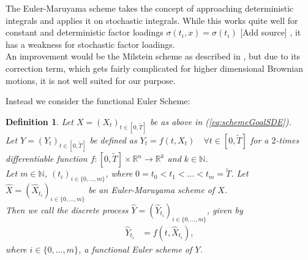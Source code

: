 \documentclass[12pt]{article}
\newtheorem{definition}[theorem]{Definition}
\begin{document}
	The Euler-Maruyama scheme takes the concept of approaching deterministic integrals and applies it on stochastic integrals. While this works quite well for constant and deterministic factor loadings $\sigma(t_i, x) = \sigma(t_i)$ \color{red}[Add source]\color{black} %
	, it has a weakness for stochastic factor loadings.\\
	An improvement would be the Milstein scheme as described in \cite{kloedenSchemes}, but due to its correction term, which gets fairly complicated for higher dimensional Brownian motions, it is not well suited for our purpose.

	Instead we consider the functional Euler Scheme:
	\begin{definition}\label{def:funceulerscheme}
		Let $X=(X_t)_{t\in [0,\tilde{T}]}$ be as above in (\ref{eq:schemeGoalSDE}).\\
		Let $Y=(Y_t)_{t\in [0,\tilde{T}]}$ be defined as $Y_t = f(t, X_t) \quad \forall t\in [0,\tilde{T}]$ for a $2$-times differentiable function $f: [0,\tilde{T}] \times \mathbb{R}^n \rightarrow \mathbb{R}^k$ and $k \in \mathbb{N}$.\\
		Let $m \in \mathbb{N}$, $(t_i)_{i\in \{0, ..., m\}}$, where $0=t_0 < t_1 < ... < t_m=\tilde{T}$. Let  $\hat{X} = (\hat{X}_{t_i})_{i \in \{0, ..., m\}}$ be an Euler-Maruyama scheme of $X$.\\
		Then we call the discrete process $\hat{Y} = (\hat{Y}_{t_i})_{i \in \{0, ..., m\}}$, given by
		\begin{align*}
			\hat{Y}_{t_i} &= f(t,\hat{X}_{t_i}),
		\end{align*}
		where $i \in \{0, ..., m\}$, a \emph{functional Euler scheme of $Y$}.
	\end{definition}
\end{document}
